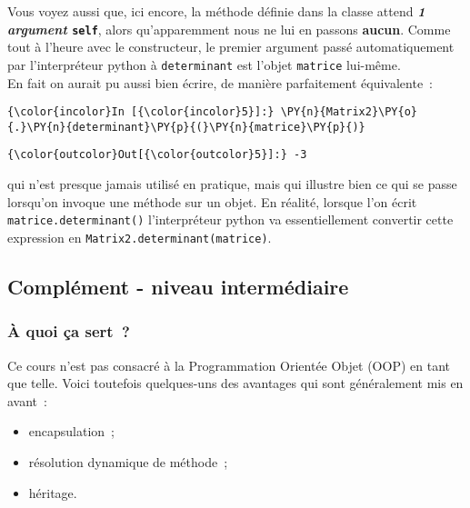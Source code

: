     Vous voyez aussi que, ici encore, la méthode définie dans la classe
attend \textbf{\emph{1 argument} \texttt{self}}, alors qu'apparemment
nous ne lui en passons \textbf{aucun}. Comme tout à l'heure avec le
constructeur, le premier argument passé automatiquement par
l'interpréteur python à \texttt{determinant} est l'objet
\texttt{matrice} lui-même.\\

En fait on aurait pu aussi bien écrire, de manière parfaitement
équivalente~:

    \begin{Verbatim}[commandchars=\\\{\}]
{\color{incolor}In [{\color{incolor}5}]:} \PY{n}{Matrix2}\PY{o}{.}\PY{n}{determinant}\PY{p}{(}\PY{n}{matrice}\PY{p}{)}
\end{Verbatim}


\begin{Verbatim}[commandchars=\\\{\}]
{\color{outcolor}Out[{\color{outcolor}5}]:} -3
\end{Verbatim}
            
    qui n'est presque jamais utilisé en pratique, mais qui illustre bien ce
qui se passe lorsqu'on invoque une méthode sur un objet. En réalité,
lorsque l'on écrit \texttt{matrice.determinant()} l'interpréteur python
va essentiellement convertir cette expression en
\texttt{Matrix2.determinant(matrice)}.

    \hypertarget{compluxe9ment---niveau-intermuxe9diaire}{%
\subsection{Complément - niveau
intermédiaire}\label{compluxe9ment---niveau-intermuxe9diaire}}

    \hypertarget{uxe0-quoi-uxe7a-sert}{%
\subsubsection{À quoi ça sert~?}\label{uxe0-quoi-uxe7a-sert}}

    Ce cours n'est pas consacré à la Programmation Orientée Objet (OOP) en
tant que telle. Voici toutefois quelques-uns des avantages qui sont
généralement mis en avant~:

\begin{itemize}
\tightlist
\item
  encapsulation~;
\item
  résolution dynamique de méthode~;
\item
  héritage.
\end{itemize}

